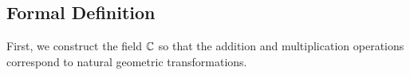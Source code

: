 \documentclass{memoir}
\begin{document}
%
%

\subsection{Formal Definition}
\label{sub:formal_definition}

First, we construct the field \(\mathbb{C}\) so that the addition and multiplication operations correspond to natural geometric transformations.
\end{document}
